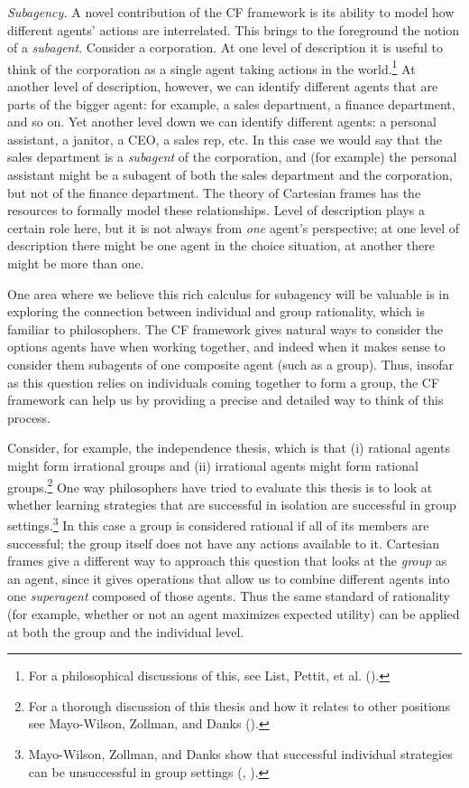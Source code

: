 \documentclass{article}
\begin{document}
\noindent \textit{Subagency.} A novel contribution of the CF framework is its ability to model how different agents' actions are interrelated. This brings to the foreground the notion of a \textit{subagent}. Consider a corporation. At one level of description it is useful to think of the corporation as a single agent taking actions in the world.\footnote{For a philosophical discussions of this, see List, Pettit, et al. (\citeyear{list2011group}).} At another level of description, however, we can identify different agents that are parts of the bigger agent: for example, a sales department, a finance department, and so on. Yet another level down we can identify different agents: a personal assistant, a janitor, a CEO, a sales rep, etc. In this case we would say that the sales department is a \textit{subagent} of the corporation, and (for example) the personal assistant might be a subagent of both the sales department and the corporation, but not of the finance department. The theory of Cartesian frames has the resources to formally model these relationships. Level of description plays a certain role here, but it is not always from \textit{one} agent's perspective; at one level of description there might be one agent in the choice situation, at another there might be more than one.  
 
One area where we believe this rich calculus for subagency will be valuable is in exploring the connection between individual and group rationality, which is familiar to philosophers. The CF framework gives natural ways to consider the options agents have when working together, and indeed when it makes sense to consider them subagents of one composite agent (such as a group). Thus, insofar as this question relies on individuals coming together to form a group, the CF framework can help us by providing a precise and detailed way to think of this process. 

Consider, for example, the independence thesis, which is that (i) rational agents might form irrational groups and (ii) irrational agents might form rational groups.\footnote{For a thorough discussion of this thesis and how it relates to other positions see Mayo-Wilson, Zollman, and Danks (\citeyear{independencethesis}).} One way philosophers have tried to evaluate this thesis is to look at whether learning strategies that are successful in isolation are successful in group settings.\footnote{Mayo-Wilson, Zollman, and Danks show that successful individual strategies can be unsuccessful in group settings (\citeyear{independencethesis}, \citeyear{mayo2013wisdom}).} In this case a group is considered rational if all of its members are successful; the group itself does not have any actions available to it. Cartesian frames give a different way to approach this question that looks at the \textit{group} as an agent, since it gives operations that allow us to combine different agents into one \textit{superagent} composed of those agents. Thus the same standard of rationality (for example, whether or not an agent maximizes expected utility) can be applied at both the group  and the individual level. 
\end{document}
